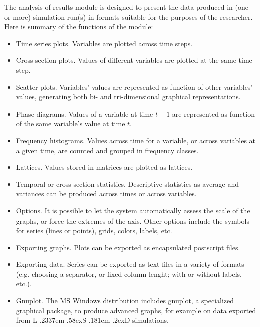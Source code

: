 \documentclass [11pt,a4paper] {book}
\def\LsD{{L\kern-.2337em\lower-.58ex\hbox{S}\kern-.181em\lower-.2ex\hbox{D}}\xspace}
\begin{document}
The analysis of results module is designed to present the data produced in (one or more) simulation run(s) in formats suitable for the purposes of the researcher. Here is summary of the functions of the module:

\begin{itemize}
	\item Time series plots. Variables are plotted across time steps.
	
	\item Cross-section plots. Values of different variables are plotted at the same time step.
	
	\item Scatter plots. Variables' values are represented as function of other variables' values, generating both bi- and tri-dimensional graphical representations.

	\item Phase diagrams. Values of a variable at time $t+1$ are represented as function of the same variable's value at time $t$.
	
	\item Frequency histograms. Values across time for a variable, or across variables at a given time, are counted and grouped in frequency classes.
	
	\item Lattices. Values stored in matrices are plotted as lattices.
	
	\item Temporal or cross-section statistics. Descriptive statistics as average and variances can be produced across times or across variables.
	
	\item Options. It is possible to let the system automatically assess the scale of the graphs, or force the extremes of the axis. Other options include the symbols for series (lines or points), grids, colors, labels, etc.
	
	\item Exporting graphs. Plots can be exported as encapsulated postscript files.
	
	\item Exporting data. Series can be exported as text files in a variety of formats (e.g. choosing a separator, or fixed-column lenght; with or without labels, etc.).
	
	\item Gnuplot. The MS Windows distribution includes gnuplot, a specialized graphical package, to produce advanced graphs, for example on data exported from \LsD simulations.
\end{itemize}
\end{document}
